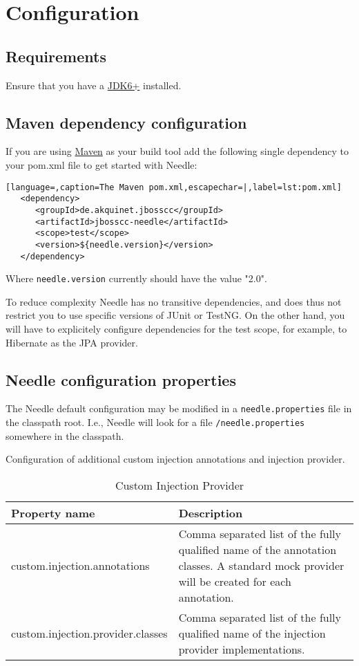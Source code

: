 \chapter{Configuration}

\section{Requirements}

Ensure that you have a 
\href{http://www.oracle.com/technetwork/java/javase/downloads/index.html}{JDK6+} installed.

\section{Maven dependency configuration}
If you are using \href{http://maven.apache.org/}{Maven} as your build tool add the following single dependency to your pom.xml file to get started with Needle:

\begin{lstlisting}[language=,caption=The Maven pom.xml,escapechar=|,label=lst:pom.xml]
   <dependency>
      <groupId>de.akquinet.jbosscc</groupId>
      <artifactId>jbosscc-needle</artifactId>
      <scope>test</scope>
      <version>${needle.version}</version>
   </dependency>
\end{lstlisting}

Where \verb|needle.version| currently should have the value "2.0". 

To reduce complexity Needle has no transitive dependencies, and does thus not restrict you to use specific versions of JUnit or TestNG.
On the other hand, you will have to explicitely configure dependencies for the test scope, for example, to Hibernate as the JPA provider.

\section{Needle configuration properties}

The Needle default configuration may be modified in a \verb|needle.properties| file in the classpath root. I.e., Needle will look for a file 
\verb|/needle.properties| somewhere in the classpath.

\parskip 14pt
\parindent 0pt
Configuration of additional custom injection annotations and injection provider.

\begin{table}[H]
\centering
\begin{tabular}{p{6cm}p{11cm}} \toprule
    \textbf{Property name} & \textbf{Description} \\ \midrule
    custom.injection.annotations & Comma separated list of the fully qualified name of the annotation classes. A standard mock provider will be created for each annotation. \\
    custom.injection.provider.classes & Comma separated list of the fully qualified name of the injection provider implementations. \\
\bottomrule
\end{tabular}
\caption{Custom Injection Provider}
\end{table}

